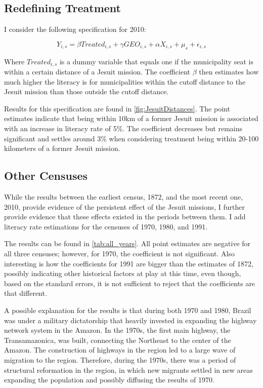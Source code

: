 \documentclass{article}
\begin{document}
\subsection{Redefining Treatment}

I consider the following specification for 2010:

\begin{equation}
\label{eqn:treated}
	Y_{i,s} = \beta \textit{Treated}_{i,s} + \gamma \textit{GEO}_{i,s} +  \alpha \textit{X}_{i,s} + \mu_s + \epsilon_{i,s}
\end{equation}

Where $Treated_{i,s}$ is a dummy variable that equals one if the municipality seat is within a certain distance of a Jesuit mission. 
The coefficient $\beta$ then estimates how much higher the literacy is for municipalities within the cutoff distance to the Jesuit mission than those outside the cutoff distance.

Results for this specification are found in \autoref{fig:JesuitDistances}. 
The point estimates indicate that being within 10km of a former Jesuit mission is associated with an increase in literacy rate of 5\%. 
The coefficient decreases but remains significant and settles around 3\% when considering treatment being within 20-100 kilometers of a former Jesuit mission. 

\subsection{Other Censuses}

While the results between the earliest census, 1872, and the most recent one, 2010, provide evidence of the persistent effect of the Jesuit missions, I further provide evidence that these effects existed in the periods between them.
I add literacy rate estimations for the censuses of 1970, 1980, and 1991.

The results can be found in  \autoref{tab:all_years}. 
All point estimates are negative for all three censuses; however, for 1970, the coefficient is not significant. 
Also interesting is how the coefficients for 1991 are bigger than the estimates of 1872, possibly indicating other historical factors at play at this time, even though, based on the standard errors, it is not sufficient to reject that the coefficients are that different. 

A possible explanation for the results is that during both 1970 and 1980, Brazil was under a military dictatorship that heavily invested in expanding the highway network system in the Amazon. 
In the 1970s, the first main highway, the Transamazonica, was built, connecting the Northeast to the center of the Amazon.
The construction of highways in the region led to a large wave of migration to the region. 
Therefore, during the 1970s, there was a period of structural reformation in the region, in which new migrants settled in new areas expanding the population and possibly diffusing the results of 1970.
\end{document}
